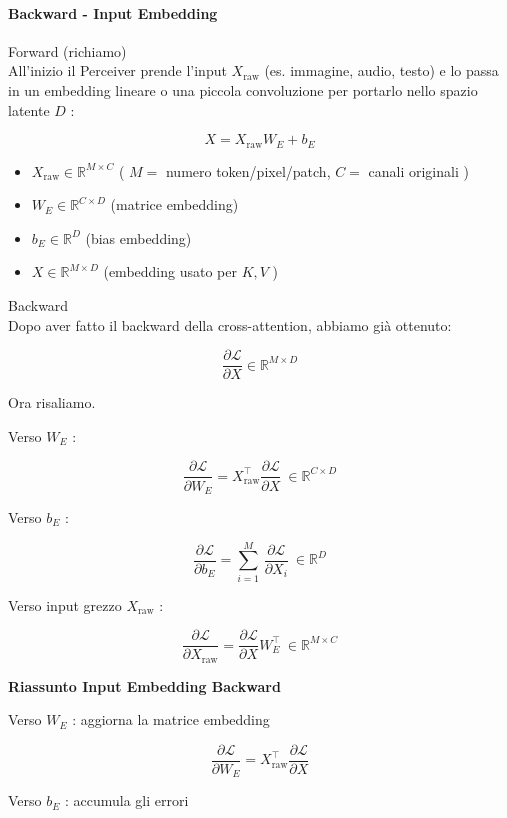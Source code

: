 \documentclass[
  11pt,
]{article}
\begin{document}
\paragraph{Backward - Input Embedding}
Forward (richiamo)\\
All'inizio il Perceiver prende l'input
\(X_{\text{raw}}\) (es. immagine, audio, testo) e lo passa in un
embedding lineare o una piccola convoluzione per portarlo nello spazio
latente \(D\) :

\[X = X_{\text{raw}}W_{E} + b_{E}\]

\begin{itemize}
\item
  \(X_{\text{raw}} \in \mathbb{R}^{M \times C}\) ( \(M =\) numero
  token/pixel/patch, \(C =\) canali originali )
\item
  \(W_{E} \in \mathbb{R}^{C \times D}\) (matrice embedding)
\item
  \(b_{E} \in \mathbb{R}^{D}\) (bias embedding)
\item
  \(X \in \mathbb{R}^{M \times D}\) (embedding usato per \(K,V\) )
\end{itemize}

Backward\\
Dopo aver fatto il backward della cross-attention, abbiamo già ottenuto:

\[\frac{\partial\mathcal{L}}{\partial X} \in \mathbb{R}^{M \times D}\]

Ora risaliamo.

Verso \(W_{E}\) :

\[\frac{\partial\mathcal{L}}{\partial W_{E}} = X_{\text{raw}}^{\top}\frac{\partial\mathcal{L}}{\partial X}\  \in \mathbb{R}^{C \times D}\]

Verso \(b_{E}\) :

\[\frac{\partial\mathcal{L}}{\partial b_{E}} = \sum_{i = 1}^{M}\,\frac{\partial\mathcal{L}}{\partial X_{i}}\  \in \mathbb{R}^{D}\]

Verso input grezzo \(X_{\text{raw}}\) :

\[\frac{\partial\mathcal{L}}{\partial X_{\text{raw}}} = \frac{\partial\mathcal{L}}{\partial X}W_{E}^{\top}\  \in \mathbb{R}^{M \times C}\]

\textbf{Riassunto Input Embedding Backward}

Verso \(W_{E}\) : aggiorna la matrice embedding

\[\frac{\partial\mathcal{L}}{\partial W_{E}} = X_{\text{raw}}^{\top}\frac{\partial\mathcal{L}}{\partial X}\]

Verso \(b_{E}\) : accumula gli errori
\end{document}

